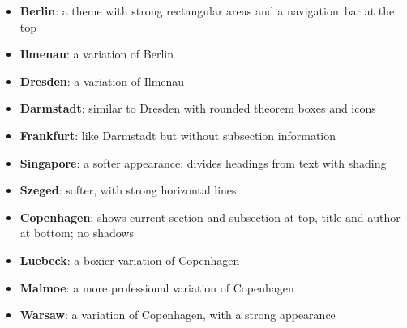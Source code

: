\documentclass[notes=show,beamer]{beamer}
\begin{document}
\begin{frame}%

\hypertarget{mini}{}


\begin{itemize}
\item \textbf{Berlin}: a theme with strong rectangular areas and a
navigation\ bar at the top

\item \textbf{Ilmenau}: a variation of Berlin

\item \textbf{Dresden}: a variation of Ilmenau

\item \textbf{Darmstadt}: similar to Dresden with rounded theorem boxes and
icons

\item \textbf{Frankfurt}: like Darmstadt but without subsection information

\item \textbf{Singapore}: a softer appearance; divides headings from text
with shading

\item \textbf{Szeged}: softer, with strong horizontal lines
\end{itemize}

\transboxout%
\end{frame}%

\begin{frame}%

\hypertarget{sec}{}


\begin{itemize}
\item \textbf{Copenhagen}: shows current section and subsection at top,
title and author at bottom; no shadows

\item \textbf{Luebeck}: a boxier variation of Copenhagen

\item \textbf{Malmoe}: a more professional variation of Copenhagen

\item \textbf{Warsaw}: a variation of Copenhagen, with a strong appearance
\end{itemize}

\transboxout%
\end{frame}%
\end{document}
